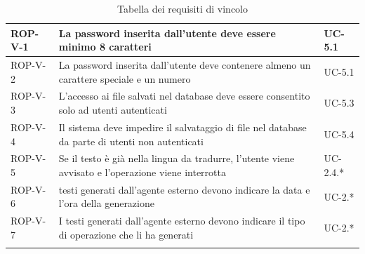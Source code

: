 \documentclass[11pt,a4paper]{article}
\begin{document}
\begin{longtable}{|p{}|>{\raggedright\arraybackslash}p{}|p{}|}
\hline
ROP-V-1 & La password inserita dall'utente deve essere minimo 8 caratteri & UC-5.1 \\
\hline
ROP-V-2 & La password inserita dall'utente deve contenere almeno un carattere speciale e un numero & UC-5.1 \\
\hline
ROP-V-3 & L'accesso ai file salvati nel database deve essere consentito solo ad utenti autenticati & UC-5.3 \\
\hline
ROP-V-4 & Il sistema deve impedire il salvataggio di file nel database da parte di utenti non autenticati & UC-5.4 \\
\hline
ROP-V-5 & Se il testo è già nella lingua da tradurre, l'utente viene avvisato e l'operazione viene interrotta & UC-2.4.* \\
\hline
ROP-V-6 &  testi generati dall’agente esterno devono indicare la data e l’ora della generazione & UC-2.* \\
\hline
ROP-V-7 & I testi generati dall’agente esterno devono indicare il tipo di operazione che li ha generati & UC-2.* \\
\hline
\addlinespace[1em]
\caption{Tabella dei requisiti di vincolo}
\end{longtable}


\newpage
\end{document}
